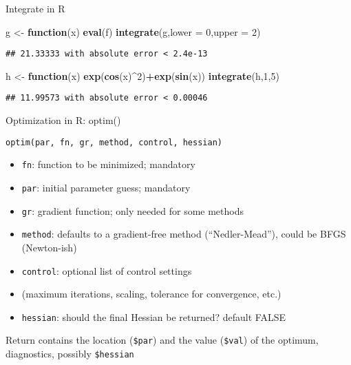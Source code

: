 \documentclass[8pt,ignorenonframetext,]{beamer}
\newenvironment{Shaded}{\begin{snugshade}}{\end{snugshade}}
\newcommand{\KeywordTok}[1]{\textcolor[rgb]{0.13,0.29,0.53}{\textbf{#1}}}
\newcommand{\DataTypeTok}[1]{\textcolor[rgb]{0.13,0.29,0.53}{#1}}
\newcommand{\DecValTok}[1]{\textcolor[rgb]{0.00,0.00,0.81}{#1}}
\newcommand{\StringTok}[1]{\textcolor[rgb]{0.31,0.60,0.02}{#1}}
\newcommand{\ControlFlowTok}[1]{\textcolor[rgb]{0.13,0.29,0.53}{\textbf{#1}}}
\newcommand{\OperatorTok}[1]{\textcolor[rgb]{0.81,0.36,0.00}{\textbf{#1}}}
\newcommand{\NormalTok}[1]{#1}
\providecommand{\tightlist}{%
  \setlength{\itemsep}{0pt}\setlength{\parskip}{0pt}}
\begin{document}
\begin{frame}[fragile]{Integrate in R}

\begin{Shaded}
\begin{Highlighting}[]
\NormalTok{g <-}\StringTok{ }\ControlFlowTok{function}\NormalTok{(x) }\KeywordTok{eval}\NormalTok{(f)}
\KeywordTok{integrate}\NormalTok{(g,}\DataTypeTok{lower =} \DecValTok{0}\NormalTok{,}\DataTypeTok{upper =} \DecValTok{2}\NormalTok{)}
\end{Highlighting}
\end{Shaded}

\begin{verbatim}
## 21.33333 with absolute error < 2.4e-13
\end{verbatim}

\begin{Shaded}
\begin{Highlighting}[]
\NormalTok{h <-}\StringTok{ }\ControlFlowTok{function}\NormalTok{(x) }\KeywordTok{exp}\NormalTok{(}\KeywordTok{cos}\NormalTok{(x)}\OperatorTok{^}\DecValTok{2}\NormalTok{)}\OperatorTok{+}\KeywordTok{exp}\NormalTok{(}\KeywordTok{sin}\NormalTok{(x))}
\KeywordTok{integrate}\NormalTok{(h,}\DecValTok{1}\NormalTok{,}\DecValTok{5}\NormalTok{)}
\end{Highlighting}
\end{Shaded}

\begin{verbatim}
## 11.99573 with absolute error < 0.00046
\end{verbatim}

\end{frame}

\begin{frame}[fragile]{Optimization in R: optim()}

\begin{verbatim}
optim(par, fn, gr, method, control, hessian)
\end{verbatim}

\begin{itemize}
\tightlist
\item
  \texttt{fn}: function to be minimized; mandatory
\item
  \texttt{par}: initial parameter guess; mandatory
\item
  \texttt{gr}: gradient function; only needed for some methods
\item
  \texttt{method}: defaults to a gradient-free method (``Nedler-Mead''),
  could be BFGS (Newton-ish)
\item
  \texttt{control}: optional list of control settings
\item
  (maximum iterations, scaling, tolerance for convergence, etc.)
\item
  \texttt{hessian}: should the final Hessian be returned? default FALSE
\end{itemize}

Return contains the location (\texttt{\$par}) and the value
(\texttt{\$val}) of the optimum, diagnostics, possibly
\texttt{\$hessian}

\end{frame}
\end{document}
